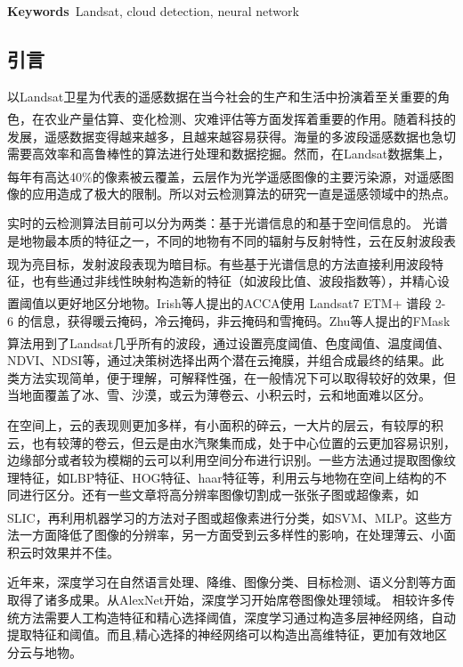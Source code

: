 \documentclass[10pt,UTF8,fntef]{ctexart}
\newcommand{\upcite}[1]{\textsuperscript{\textsuperscript{\cite{#1}}}}
\begin{document}
\noindent\textbf{Keywords}\ Landsat, cloud detection, neural network

\begin{multicols}{2} 

\setcounter{section}{0} %
\section*{引言}
以Landsat卫星为代表的遥感数据在当今社会的生产和生活中扮演着至关重要的角色，在农业产量估算\upcite{prasad2006crop}、变化检测\upcite{verbesselt2010detecting}、灾难评估\upcite{joyce2009review}等方面发挥着重要的作用。随着科技的发展，遥感数据变得越来越多，且越来越容易获得。海量的多波段遥感数据也急切需要高效率和高鲁棒性的算法进行处理和数据挖掘。然而，在Landsat数据集上，每年有高达40\%的像素被云覆盖\upcite{ju2008availability}，云层作为光学遥感图像的主要污染源，对遥感图像的应用造成了极大的限制。所以对云检测算法的研究一直是遥感领域中的热点。

实时的云检测算法目前可以分为两类：基于光谱信息的和基于空间信息的。
光谱是地物最本质的特征之一，不同的地物有不同的辐射与反射特性，云在反射波段表现为亮目标，发射波段表现为暗目标。有些基于光谱信息的方法\upcite{sun2018cloud}直接利用波段特征，也有些通过非线性映射构造新的特征（如波段比值、波段指数等），并精心设置阈值以更好地区分地物。Irish等人\upcite{irish2006characterization}提出的ACCA使用 Landsat7 ETM+ 谱段 2- 6 的信息，获得暖云掩码，冷云掩码，非云掩码和雪掩码。Zhu等人提出的FMask算法\upcite{zhu2012object}用到了Landsat几乎所有的波段，通过设置亮度阈值、色度阈值、温度阈值、NDVI、NDSI等，通过决策树选择出两个潜在云掩膜，并组合成最终的结果。此类方法实现简单，便于理解，可解释性强，在一般情况下可以取得较好的效果，但当地面覆盖了冰、雪、沙漠，或云为薄卷云、小积云时，云和地面难以区分。

在空间上，云的表现则更加多样，有小面积的碎云，一大片的层云，有较厚的积云，也有较薄的卷云，但云是由水汽聚集而成，处于中心位置的云更加容易识别，边缘部分或者较为模糊的云可以利用空间分布进行识别。一些方法通过提取图像纹理特征，如LBP特征、HOG特征、haar特征等，利用云与地物在空间上结构的不同进行区分。还有一些文章将高分辨率图像切割成一张张子图或超像素，如SLIC\upcite{achanta2012slic}，再利用机器学习的方法对子图或超像素进行分类，如SVM\upcite{lee2004cloud}、MLP\upcite{tian1999study}。这些方法一方面降低了图像的分辨率，另一方面受到云多样性的影响，在处理薄云、小面积云时效果并不佳。

近年来，深度学习在自然语言处理、降维、图像分类、目标检测、语义分割等方面取得了诸多成果。从AlexNet开始，深度学习开始席卷图像处理领域。
相较许多传统方法需要人工构造特征和精心选择阈值，深度学习通过构造多层神经网络，自动提取特征和阈值。而且,精心选择的神经网络可以构造出高维特征，更加有效地区分云与地物。


\end{multicols}
\end{document}
